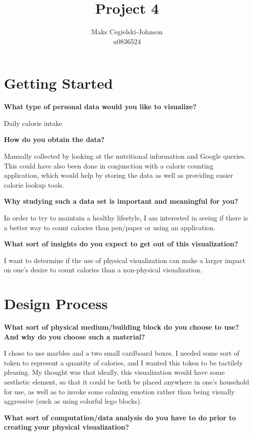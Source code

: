 \documentclass{article}
\title{Project 4}
\author{Maks Cegielski-Johnson\\u0836524}
\begin{document}
\maketitle


\section{Getting Started}

\textbf{What type of personal data would you like to visualize?}

Daily calorie intake

\textbf{How do you obtain the data?}

Manually collected by looking at the nutritional information and Google queries. This could have also been done in conjunction with a calorie counting application, which would help by storing the data as well as providing easier calorie lookup tools.

\textbf{Why studying such a data set is important and meaningful for you?}

In order to try to maintain a healthy lifestyle, I am interested in seeing if there is a better way to count calories than pen/paper or using an application. 

\textbf{What sort of insights do you expect to get out of this visualization?}

I want to determine if the use of physical visualization can make a larger impact on one's desire to count calories than a non-physical visualization. 

\section{Design Process}

\textbf{What sort of physical medium/building block do you choose to use? And why do you choose such	a material?}

I chose to use marbles and a two small cardboard boxes. I needed some sort of token to represent a quantity of calories, and I wanted this token to be tactilely pleasing. My thought was that ideally, this visualization would have some aesthetic element, so that it could be both be placed anywhere in one's household for use, as well as to invoke some calming emotion rather than being visually aggressive (such as using colorful lego blocks). 

\textbf{What sort of computation/data analysis do you have to do prior to creating your physical visualization?}
\end{document}
